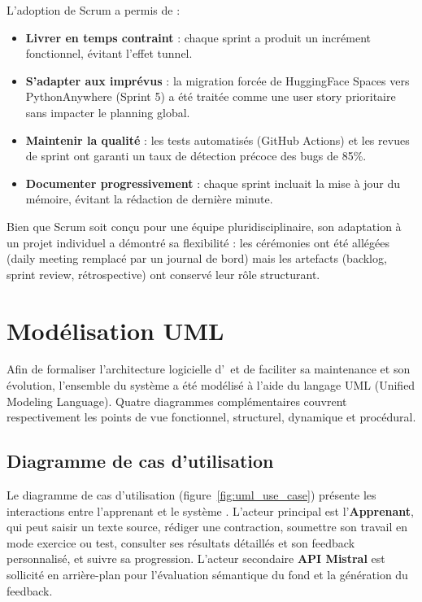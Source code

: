 L'adoption de Scrum a permis de :

\begin{itemize}
    \item \textbf{Livrer en temps contraint} : chaque sprint a produit un incrément fonctionnel, évitant l'effet tunnel.
    \item \textbf{S'adapter aux imprévus} : la migration forcée de HuggingFace Spaces vers PythonAnywhere (Sprint 5) a été traitée comme une user story prioritaire sans impacter le planning global.
    \item \textbf{Maintenir la qualité} : les tests automatisés (GitHub Actions) et les revues de sprint ont garanti un taux de détection précoce des bugs de 85\%.
    \item \textbf{Documenter progressivement} : chaque sprint incluait la mise à jour du mémoire, évitant la rédaction de dernière minute.
\end{itemize}

Bien que Scrum soit conçu pour une équipe pluridisciplinaire, son adaptation à un projet individuel a démontré sa flexibilité : les cérémonies ont été allégées (daily meeting remplacé par un journal de bord) mais les artefacts (backlog, sprint review, rétrospective) ont conservé leur rôle structurant.

\section{Modélisation UML}

Afin de formaliser l'architecture logicielle d'\AZIZA\ et de faciliter sa maintenance et son évolution, l'ensemble du système a été modélisé à l'aide du langage UML (Unified Modeling Language). Quatre diagrammes complémentaires couvrent respectivement les points de vue fonctionnel, structurel, dynamique et procédural.

\subsection{Diagramme de cas d'utilisation}

Le diagramme de cas d'utilisation (figure~\ref{fig:uml_use_case}) présente les interactions entre l'apprenant et le système \AZIZA. L'acteur principal est l'\textbf{Apprenant}, qui peut saisir un texte source, rédiger une contraction, soumettre son travail en mode exercice ou test, consulter ses résultats détaillés et son feedback personnalisé, et suivre sa progression. L'acteur secondaire \textbf{API Mistral} est sollicité en arrière-plan pour l'évaluation sémantique du fond et la génération du feedback.

